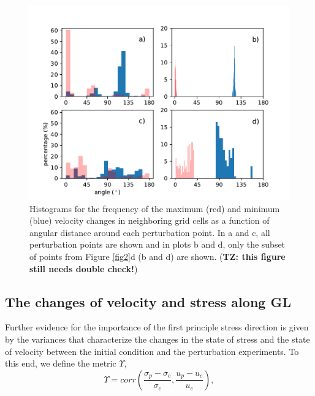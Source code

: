 \documentclass[review,oneside]{igs}
\begin{document}
\begin{figure}
	\centering
    \includegraphics[width=1\linewidth]{figs/fig4.pdf}
    \caption{Histograms for the frequency of the maximum (red) and minimum (blue) velocity changes in neighboring grid cells as a function of angular distance around each perturbation point. In a and c, all perturbation points are shown and in plots b and d, only the subset of points from Figure \ref{fig2}d (b and d) are shown. ({\bf{TZ: this figure still needs double check!}})}
	\label{fig4}
\end{figure}

\subsection{The changes of velocity and stress along GL}

Further evidence for the importance of the first principle stress direction is given by the variances that characterize the changes in the state of stress and the state of velocity between the initial condition and the perturbation experiments. To this end, we define the metric $\Upsilon$,  
\begin{equation}
    \Upsilon= corr\left(\frac{\sigma_{p}-\sigma_{c}}{\sigma_{c}}, \frac{u_{p}-u_{c}}{u_{c}}\right),
\label{upsilon}
\end{equation}
\end{document}
